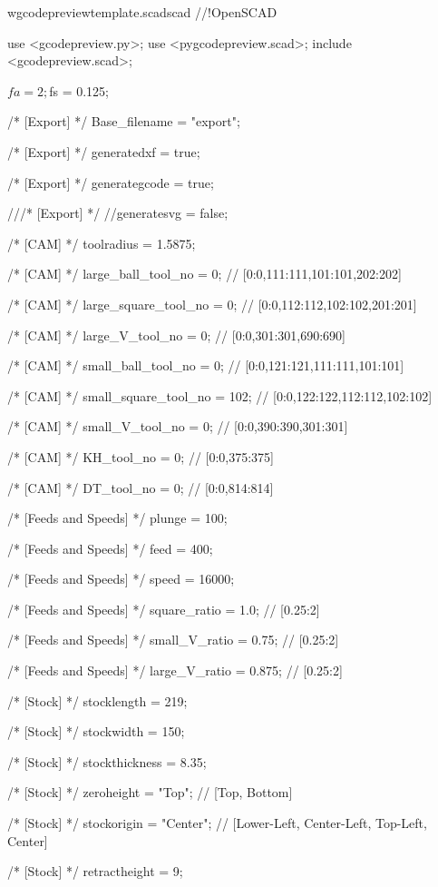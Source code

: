 \documentclass{ltxdoc}
\begin{document}
\lstset{firstnumber=1}%
\begin{writecode}{w}{gcodepreviewtemplate.scad}{scad}
//!OpenSCAD

use <gcodepreview.py>;
use <pygcodepreview.scad>;
include <gcodepreview.scad>;

$fa = 2;
$fs = 0.125;

/* [Export] */
Base_filename = "export"; 

/* [Export] */
generatedxf = true; 

/* [Export] */
generategcode = true; 

///* [Export] */
//generatesvg = false; 

/* [CAM] */
toolradius = 1.5875;

/* [CAM] */
large_ball_tool_no = 0; // [0:0,111:111,101:101,202:202]

/* [CAM] */
large_square_tool_no = 0; // [0:0,112:112,102:102,201:201]

/* [CAM] */
large_V_tool_no = 0; // [0:0,301:301,690:690]

/* [CAM] */
small_ball_tool_no = 0; // [0:0,121:121,111:111,101:101]

/* [CAM] */
small_square_tool_no = 102; // [0:0,122:122,112:112,102:102]

/* [CAM] */
small_V_tool_no = 0; // [0:0,390:390,301:301]

/* [CAM] */
KH_tool_no = 0; // [0:0,375:375]

/* [CAM] */
DT_tool_no = 0; // [0:0,814:814]

/* [Feeds and Speeds] */
plunge = 100;

/* [Feeds and Speeds] */
feed = 400;

/* [Feeds and Speeds] */
speed = 16000;

/* [Feeds and Speeds] */
square_ratio = 1.0; // [0.25:2]

/* [Feeds and Speeds] */
small_V_ratio = 0.75; // [0.25:2]

/* [Feeds and Speeds] */
large_V_ratio = 0.875; // [0.25:2]

/* [Stock] */
stocklength = 219;

/* [Stock] */
stockwidth = 150;

/* [Stock] */
stockthickness = 8.35;

/* [Stock] */
zeroheight = "Top"; // [Top, Bottom]

/* [Stock] */
stockorigin = "Center"; // [Lower-Left, Center-Left, Top-Left, Center]

/* [Stock] */
retractheight = 9;


\end{writecode}
\end{document}
